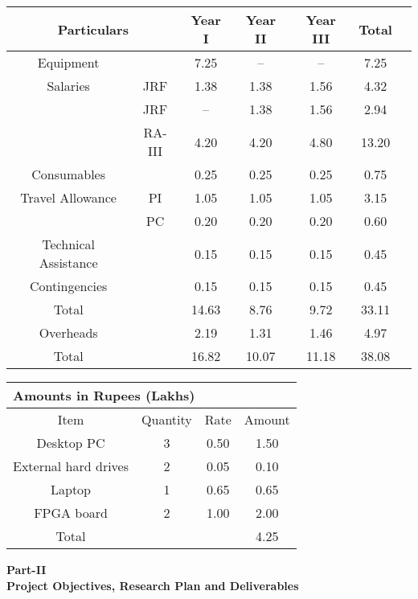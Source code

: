 \documentclass[12pt]{article}
\begin{document}
\begin{center}
\begin{tabular}{|c|c|c|c|c|c|c|}
\hline
\multicolumn{2}{|c|}{Particulars} & Year I & Year II & Year III & Total \\
\hline
\hline
Equipment &  & 7.25 & -- & -- & 7.25 \\
Salaries & JRF & 1.38 & 1.38 & 1.56 & 4.32 \\
 & JRF & -- & 1.38 & 1.56 & 2.94 \\
 & RA-III & 4.20 & 4.20 & 4.80 & 13.20 \\
Consumables &  & 0.25 & 0.25 & 0.25 & 0.75 \\
Travel Allowance & PI & 1.05 & 1.05 & 1.05 & 3.15 \\
 & PC & 0.20 & 0.20 & 0.20 & 0.60 \\
Technical Assistance &  & 0.15 & 0.15 & 0.15 & 0.45 \\
Contingencies &  & 0.15 & 0.15 & 0.15 & 0.45 \\
\hline
Total &  & 14.63 & 8.76 & 9.72 & 33.11 \\
\hline 
Overheads &  & 2.19 & 1.31 & 1.46 & 4.97\\
\hline
Total &  & 16.82 & 10.07 & 11.18 & 38.08\\
\hline
\end{tabular}
\end{center}


\begin{center}
\begin{tabular}{|c|c|c|c|}
\multicolumn{4}{l}{\bf Amounts in Rupees (Lakhs)}\\
\hline
Item & Quantity & Rate & Amount \\
\hline
Desktop PC & 3 & 0.50 & 1.50 \\
External hard drives & 2 & 0.05 & 0.10 \\
Laptop & 1 & 0.65 & 0.65 \\
FPGA board & 2 & 1.00 & 2.00 \\
\hline
Total & & & 4.25 \\
\hline
\end{tabular}
\end{center}

\newpage

\begin{center} {\bf \large Part-II\\
\vspace{2ex}
Project Objectives, Research Plan and Deliverables}
\end{center}
\end{document}
